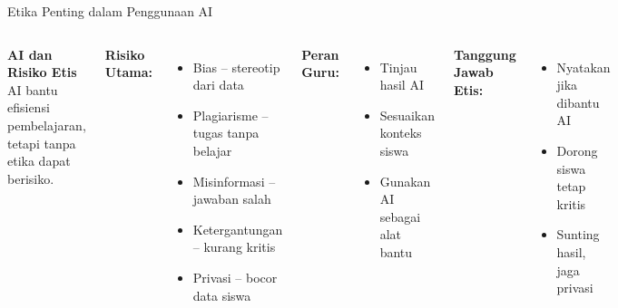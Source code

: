 \documentclass[aspectratio=169, table]{beamer}
\begin{document}
	
\begin{frame}[fragile]{Etika Penting dalam Penggunaan AI}
	\vspace{10pt}
	\begin{columns}[T]
		\textbf{AI dan Risiko Etis} \\
		AI bantu efisiensi pembelajaran, tetapi tanpa etika dapat berisiko.
		
		\vspace{5pt}
		\textbf{Risiko Utama:}
		\begin{itemize}
			\item Bias – stereotip dari data
			\item Plagiarisme – tugas tanpa belajar
			\item Misinformasi – jawaban salah
			\item Ketergantungan – kurang kritis
			\item Privasi – bocor data siswa
		\end{itemize}
		
		\textbf{Peran Guru:}
		\begin{itemize}
			\item Tinjau hasil AI
			\item Sesuaikan konteks siswa
			\item Gunakan AI sebagai alat bantu
		\end{itemize}
		
		\vspace{5pt}
		\textbf{Tanggung Jawab Etis:}
		\begin{itemize}
			\item Nyatakan jika dibantu AI
			\item Dorong siswa tetap kritis
			\item Sunting hasil, jaga privasi
		\end{itemize}
	\end{columns}
\end{frame}
\end{document}
